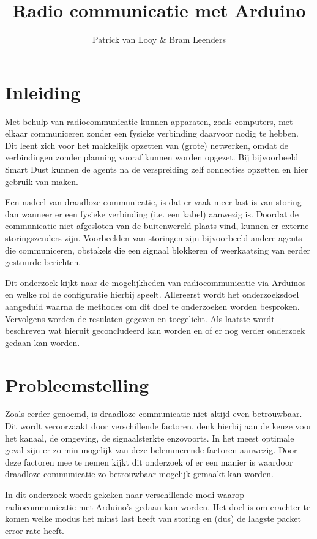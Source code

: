 \documentclass[a4paper,10pt]{article}
\title{Radio communicatie met Arduino}
\author{Patrick van Looy \& Bram Leenders}
\begin{document}
\maketitle

\section{Inleiding}
Met behulp van radiocommunicatie kunnen apparaten, zoals computers, met elkaar communiceren zonder een fysieke verbinding daarvoor nodig te hebben. Dit leent zich voor het makkelijk opzetten van (grote) netwerken, omdat de verbindingen zonder planning vooraf kunnen worden opgezet. Bij bijvoorbeeld Smart Dust kunnen de agents na de verspreiding zelf connecties opzetten en hier gebruik van maken.

Een nadeel van draadloze communicatie, is dat er vaak meer last is van storing dan wanneer er een fysieke verbinding (i.e. een kabel) aanwezig is. Doordat de communicatie niet afgesloten van de buitenwereld plaats vind, kunnen er externe storingszenders zijn. Voorbeelden van storingen zijn bijvoorbeeld andere agents die communiceren, obstakels die een signaal blokkeren of weerkaatsing van eerder gestuurde berichten.

Dit onderzoek kijkt naar de mogelijkheden van radiocommunicatie via Arduinos en welke rol de configuratie hierbij speelt. Allereerst wordt het onderzoeksdoel aangeduid waarna de methodes om dit doel te onderzoeken worden besproken. Vervolgens worden de resulaten gegeven en toegelicht. Als laatste wordt beschreven wat hieruit geconcludeerd kan worden en of er nog verder onderzoek gedaan kan worden.

\section{Probleemstelling}
Zoals eerder genoemd, is draadloze communicatie niet altijd even betrouwbaar. Dit wordt veroorzaakt door verschillende factoren, denk hierbij aan de keuze voor het kanaal, de omgeving, de signaalsterkte enzovoorts. In het meest optimale geval zijn er zo min mogelijk van deze belemmerende factoren aanwezig. Door deze factoren mee te nemen kijkt dit onderzoek of er een manier is waardoor draadloze communicatie zo betrouwbaar mogelijk gemaakt kan worden.

In dit onderzoek wordt gekeken naar verschillende modi waarop radiocommunicatie met Arduino's gedaan kan worden. Het doel is om erachter te komen welke modus het minst last heeft van storing en (dus) de laagste packet error rate heeft.
\end{document}
